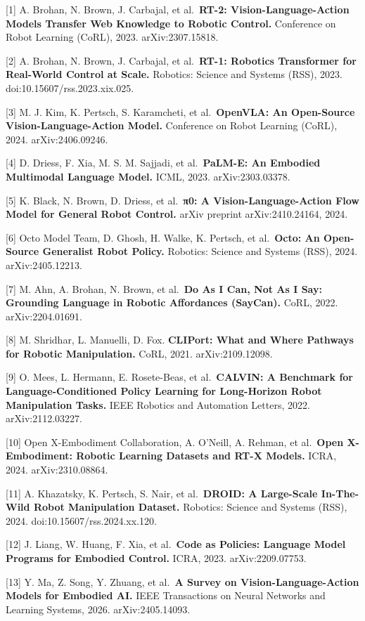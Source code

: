 {[}1{]} A. Brohan, N. Brown, J. Carbajal, et al.~\textbf{RT-2: Vision-Language-Action Models Transfer Web Knowledge to Robotic Control.} Conference on Robot Learning (CoRL), 2023. arXiv:2307.15818.

{[}2{]} A. Brohan, N. Brown, J. Carbajal, et al.~\textbf{RT-1: Robotics Transformer for Real-World Control at Scale.} Robotics: Science and Systems (RSS), 2023. doi:10.15607/rss.2023.xix.025.

{[}3{]} M. J. Kim, K. Pertsch, S. Karamcheti, et al.~\textbf{OpenVLA: An Open-Source Vision-Language-Action Model.} Conference on Robot Learning (CoRL), 2024. arXiv:2406.09246.

{[}4{]} D. Driess, F. Xia, M. S. M. Sajjadi, et al.~\textbf{PaLM-E: An Embodied Multimodal Language Model.} ICML, 2023. arXiv:2303.03378.

{[}5{]} K. Black, N. Brown, D. Driess, et al.~\textbf{π0: A Vision-Language-Action Flow Model for General Robot Control.} arXiv preprint arXiv:2410.24164, 2024.

{[}6{]} Octo Model Team, D. Ghosh, H. Walke, K. Pertsch, et al.~\textbf{Octo: An Open-Source Generalist Robot Policy.} Robotics: Science and Systems (RSS), 2024. arXiv:2405.12213.

{[}7{]} M. Ahn, A. Brohan, N. Brown, et al.~\textbf{Do As I Can, Not As I Say: Grounding Language in Robotic Affordances (SayCan).} CoRL, 2022. arXiv:2204.01691.

{[}8{]} M. Shridhar, L. Manuelli, D. Fox. \textbf{CLIPort: What and Where Pathways for Robotic Manipulation.} CoRL, 2021. arXiv:2109.12098.

{[}9{]} O. Mees, L. Hermann, E. Rosete-Beas, et al.~\textbf{CALVIN: A Benchmark for Language-Conditioned Policy Learning for Long-Horizon Robot Manipulation Tasks.} IEEE Robotics and Automation Letters, 2022. arXiv:2112.03227.

{[}10{]} Open X-Embodiment Collaboration, A. O'Neill, A. Rehman, et al.~\textbf{Open X-Embodiment: Robotic Learning Datasets and RT-X Models.} ICRA, 2024. arXiv:2310.08864.

{[}11{]} A. Khazatsky, K. Pertsch, S. Nair, et al.~\textbf{DROID: A Large-Scale In-The-Wild Robot Manipulation Dataset.} Robotics: Science and Systems (RSS), 2024. doi:10.15607/rss.2024.xx.120.

{[}12{]} J. Liang, W. Huang, F. Xia, et al.~\textbf{Code as Policies: Language Model Programs for Embodied Control.} ICRA, 2023. arXiv:2209.07753.

{[}13{]} Y. Ma, Z. Song, Y. Zhuang, et al.~\textbf{A Survey on Vision-Language-Action Models for Embodied AI.} IEEE Transactions on Neural Networks and Learning Systems, 2026. arXiv:2405.14093.

